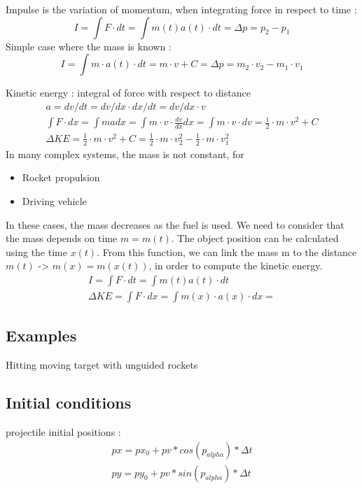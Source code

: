 \documentclass[12pt,a4paper]{article}
\begin{document}
Impulse is the variation of momentum, when integrating force in respect to time : 
\begin{equation}
	I = \int F \cdot dt = \int m(t) a(t) \cdot dt = \Delta p = p_2 - p_1 
\end{equation}
Simple case where the mass is known : 
\begin{equation}
	I = \int m \cdot a(t) \cdot dt = m \cdot v + C = \Delta p = m_2 \cdot v_2 - m_1 \cdot v_1
\end{equation}

Kinetic energy : integral of force with respect to distance
\begin{eqnarray}
	a = dv / dt = dv / dx \cdot dx /dt = dv /dx \cdot v\\
	\int F \cdot dx = \int m a dx =  \int m \cdot v \cdot \frac{dv}{dx} dx = \int m \cdot v \cdot dv = \frac{1}{2} \cdot m \cdot v^2 + C\\
	\Delta KE = \frac{1}{2} \cdot m \cdot v^2 + C = \frac{1}{2} \cdot m \cdot v_2^2 - \frac{1}{2} \cdot m \cdot v_1^2
\end{eqnarray}
In many complex systems, the mass is not constant, for
\begin{itemize}
	\item Rocket propulsion
	\item Driving vehicle 
\end{itemize} 
In these cases, the mass decreases as the fuel is used. We need to consider that the mass depends on time $m = m(t)$. The object position can be calculated using the time $x(t)$. From this function, we can link the mass m to the distance $m(t)$ -> $m(x) = m(x(t))$, in order to compute the kinetic energy. 
\begin{eqnarray}
	I = \int F \cdot dt = \int m(t) a(t) \cdot dt\\
	\Delta KE = \int F \cdot dx = \int m(x) \cdot a(x) \cdot dx =
\end{eqnarray}
\subsection{Examples}

Hitting moving target with unguided rockets


\subsection{Initial conditions}

projectile initial positions : 
\begin{eqnarray}
	px = px_0 + pv * cos(p_{alpha}) * \Delta t\\
	py = py_0 + pv * sin(p_{alpha}) * \Delta t
\end{eqnarray}
\end{document}
